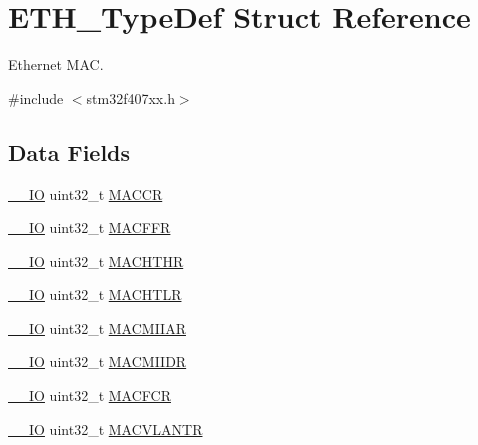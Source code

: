 \hypertarget{struct_e_t_h___type_def}{}\section{E\+T\+H\+\_\+\+Type\+Def Struct Reference}
\label{struct_e_t_h___type_def}


Ethernet M\+AC.  




{\ttfamily \#include $<$stm32f407xx.\+h$>$}

\subsection*{Data Fields}
\begin{DoxyCompactItemize}
\item 
\hyperlink{core__sc300_8h_aec43007d9998a0a0e01faede4133d6be}{\+\_\+\+\_\+\+IO} uint32\+\_\+t \hyperlink{struct_e_t_h___type_def_a20acbcac1c35f66de94c9ff0e2ddc7b0}{M\+A\+C\+CR}
\item 
\hyperlink{core__sc300_8h_aec43007d9998a0a0e01faede4133d6be}{\+\_\+\+\_\+\+IO} uint32\+\_\+t \hyperlink{struct_e_t_h___type_def_a8ad4e3dbde1518ecde5d979c2a89a76a}{M\+A\+C\+F\+FR}
\item 
\hyperlink{core__sc300_8h_aec43007d9998a0a0e01faede4133d6be}{\+\_\+\+\_\+\+IO} uint32\+\_\+t \hyperlink{struct_e_t_h___type_def_a121212bdb227106df681d24e5d896a4e}{M\+A\+C\+H\+T\+HR}
\item 
\hyperlink{core__sc300_8h_aec43007d9998a0a0e01faede4133d6be}{\+\_\+\+\_\+\+IO} uint32\+\_\+t \hyperlink{struct_e_t_h___type_def_a1d34ab8e5c2041c00ba9526b3958099d}{M\+A\+C\+H\+T\+LR}
\item 
\hyperlink{core__sc300_8h_aec43007d9998a0a0e01faede4133d6be}{\+\_\+\+\_\+\+IO} uint32\+\_\+t \hyperlink{struct_e_t_h___type_def_a9ea1e1c6615eb3bd70eb328dba65fc87}{M\+A\+C\+M\+I\+I\+AR}
\item 
\hyperlink{core__sc300_8h_aec43007d9998a0a0e01faede4133d6be}{\+\_\+\+\_\+\+IO} uint32\+\_\+t \hyperlink{struct_e_t_h___type_def_a87c7687c35332bf5ee86473043652146}{M\+A\+C\+M\+I\+I\+DR}
\item 
\hyperlink{core__sc300_8h_aec43007d9998a0a0e01faede4133d6be}{\+\_\+\+\_\+\+IO} uint32\+\_\+t \hyperlink{struct_e_t_h___type_def_a12f62d3d3b9ee30c20c324b146e72795}{M\+A\+C\+F\+CR}
\item 
\hyperlink{core__sc300_8h_aec43007d9998a0a0e01faede4133d6be}{\+\_\+\+\_\+\+IO} uint32\+\_\+t \hyperlink{struct_e_t_h___type_def_a92ff1fe799bb33d13efbaa1195867781}{M\+A\+C\+V\+L\+A\+N\+TR}

\end{DoxyCompactItemize}
